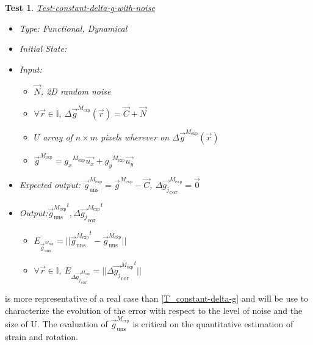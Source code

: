 \documentclass[12pt, titlepage]{article}
\newtheorem{Test}{Test}
\begin{document}
\begin{Test}\normalfont\underline{Test-constant-delta-g-with-noise}
\label{T_constant-delta-g-with-noise}
\begin{itemize}
\item Type: Functional, Dynamical
\item Initial State: 
\item Input: 
	\begin{itemize}
	\item $\overrightarrow{N}$, 2D random noise
	\item $\forall \vec{r} \in \mathbb{I}, \ \Delta \overrightarrow{g}^{M_{\text{exp}}}(\vec{r})=\overrightarrow{C} + \overrightarrow{N}$
	\item $U$ array of $n \times m$ pixels wherever on $\Delta \overrightarrow{g}^{M_{\text{exp}}}(\vec{r})$ 
	\item $\overrightarrow{g}^{M_{\text{exp}}}={g_x}^{M_{\text{exp}}}\overrightarrow{u_x}+{g_y}^{M_{\text{exp}}}\overrightarrow{u_y}$
	\end{itemize}
\item Expected output: $\overrightarrow{g}_{\text{uns}}^{M_{\text{exp}}}=\overrightarrow{g}^{M_{\text{exp}}}-\overrightarrow{C}$,  $\Delta\overrightarrow{g_{j}}_{\text{cor}}^{M_{\text{exp}}}=\overrightarrow{0}$
\item Output:${\overrightarrow{g}_{\text{uns}}^{M_{\text{exp}}}}^{t}, {\Delta\overrightarrow{g_{j}}_{\text{cor}}^{M_{\text{exp}}}}^{t}$
	\begin{itemize}
	\item $E_{\overrightarrow{g}_{\text{uns}}^{M_{\text{exp}}}}=||{\overrightarrow{g}_{\text{uns}}^{M_{\text{exp}}}}^{t}-\overrightarrow{g}_{\text{uns}}^{M_{\text{exp}}}||$
	\item $\forall \vec{r} \in \mathbb{I}, \ E_{\Delta\overrightarrow{g_{j}}_{\text{cor}}^{M_{\text{exp}}}}=||{\Delta\overrightarrow{g_{j}}_{\text{cor}}^{M_{\text{exp}}}}^{t}||$
	\end{itemize}
\end{itemize}
\end{Test}

 is more representative of a real case than \cref{T_constant-delta-g} and will be use to characterize the evolution of the error with respect to the level of noise and the size of U. The evaluation of $\overrightarrow{g}_{\text{uns}}^{M_{\text{exp}}}$ is critical on the quantitative estimation of strain and rotation.
\end{document}
